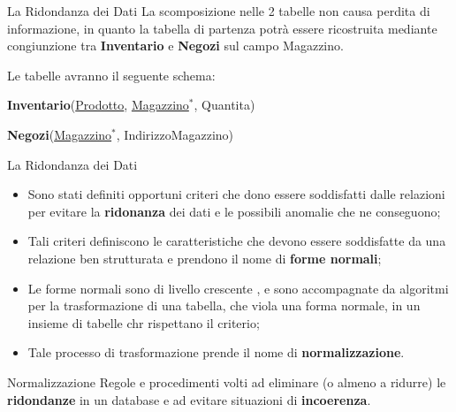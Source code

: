 %
\begin{frame}{La Ridondanza dei Dati}
La scomposizione nelle 2 tabelle non causa perdita di informazione, in quanto la tabella di partenza potr\`a essere ricostruita mediante congiunzione tra \textbf{Inventario} e \textbf{Negozi} sul campo Magazzino.
\pause

Le tabelle avranno il seguente schema:

\pause
\textbf{Inventario}(\underline{Prodotto}, \underline{Magazzino}$^*$, Quantita)\\
\pause

\textbf{Negozi}(\underline{Magazzino}$^*$, IndirizzoMagazzino)
\end{frame}
%
\begin{frame}{La Ridondanza dei Dati}
\begin{itemize}[<+->]
    \item Sono stati definiti opportuni criteri che dono essere soddisfatti dalle relazioni per evitare la \textbf{ridonanza} dei dati e le possibili anomalie che ne conseguono;
    \item Tali criteri definiscono le caratteristiche che devono essere soddisfatte da una relazione ben strutturata e prendono il nome di \textbf{forme normali};
    \item Le forme normali sono di livello crescente , e sono accompagnate da algoritmi per la trasformazione di una tabella, che viola una forma normale, in un insieme di tabelle chr rispettano il criterio;
    \item Tale processo di trasformazione prende il nome di \textbf{normalizzazione}.
\end{itemize}
\end{frame}
%
\begin{frame}{Normalizzazione}
\vspace{-1.5cm}
Regole e procedimenti volti ad eliminare (o almeno a ridurre) le \textbf{ridondanze} in un database e ad evitare situazioni di \textbf{incoerenza}.
\vspace{2em}



\end{frame}
